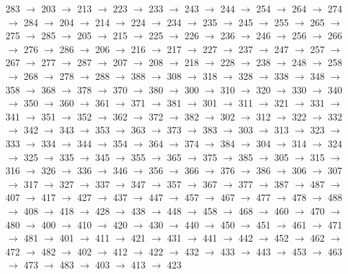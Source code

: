 283 $\rightarrow$ 203 $\rightarrow$ 213 $\rightarrow$ 223 $\rightarrow$ 233 $\rightarrow$ 243 $\rightarrow$ 244 $\rightarrow$ 254 $\rightarrow$ 264 $\rightarrow$ 274 $\rightarrow$ 284 $\rightarrow$ 204 $\rightarrow$ 214 $\rightarrow$ 224 $\rightarrow$ 234 $\rightarrow$ 235 $\rightarrow$ 245 $\rightarrow$ 255 $\rightarrow$ 265 $\rightarrow$ 275 $\rightarrow$ 285 $\rightarrow$ 205 $\rightarrow$ 215 $\rightarrow$ 225 $\rightarrow$ 226 $\rightarrow$ 236 $\rightarrow$ 246 $\rightarrow$ 256 $\rightarrow$ 266 $\rightarrow$ 276 $\rightarrow$ 286 $\rightarrow$ 206 $\rightarrow$ 216 $\rightarrow$ 217 $\rightarrow$ 227 $\rightarrow$ 237 $\rightarrow$ 247 $\rightarrow$ 257 $\rightarrow$ 267 $\rightarrow$ 277 $\rightarrow$ 287 $\rightarrow$ 207 $\rightarrow$ 208 $\rightarrow$ 218 $\rightarrow$ 228 $\rightarrow$ 238 $\rightarrow$ 248 $\rightarrow$ 258 $\rightarrow$ 268 $\rightarrow$ 278 $\rightarrow$ 288 $\rightarrow$ 388 $\rightarrow$ 308 $\rightarrow$ 318 $\rightarrow$ 328 $\rightarrow$ 338 $\rightarrow$ 348 $\rightarrow$ 358 $\rightarrow$ 368 $\rightarrow$ 378 $\rightarrow$ 370 $\rightarrow$ 380 $\rightarrow$ 300 $\rightarrow$ 310 $\rightarrow$ 320 $\rightarrow$ 330 $\rightarrow$ 340 $\rightarrow$ 350 $\rightarrow$ 360 $\rightarrow$ 361 $\rightarrow$ 371 $\rightarrow$ 381 $\rightarrow$ 301 $\rightarrow$ 311 $\rightarrow$ 321 $\rightarrow$ 331 $\rightarrow$ 341 $\rightarrow$ 351 $\rightarrow$ 352 $\rightarrow$ 362 $\rightarrow$ 372 $\rightarrow$ 382 $\rightarrow$ 302 $\rightarrow$ 312 $\rightarrow$ 322 $\rightarrow$ 332 $\rightarrow$ 342 $\rightarrow$ 343 $\rightarrow$ 353 $\rightarrow$ 363 $\rightarrow$ 373 $\rightarrow$ 383 $\rightarrow$ 303 $\rightarrow$ 313 $\rightarrow$ 323 $\rightarrow$ 333 $\rightarrow$ 334 $\rightarrow$ 344 $\rightarrow$ 354 $\rightarrow$ 364 $\rightarrow$ 374 $\rightarrow$ 384 $\rightarrow$ 304 $\rightarrow$ 314 $\rightarrow$ 324 $\rightarrow$ 325 $\rightarrow$ 335 $\rightarrow$ 345 $\rightarrow$ 355 $\rightarrow$ 365 $\rightarrow$ 375 $\rightarrow$ 385 $\rightarrow$ 305 $\rightarrow$ 315 $\rightarrow$ 316 $\rightarrow$ 326 $\rightarrow$ 336 $\rightarrow$ 346 $\rightarrow$ 356 $\rightarrow$ 366 $\rightarrow$ 376 $\rightarrow$ 386 $\rightarrow$ 306 $\rightarrow$ 307 $\rightarrow$ 317 $\rightarrow$ 327 $\rightarrow$ 337 $\rightarrow$ 347 $\rightarrow$ 357 $\rightarrow$ 367 $\rightarrow$ 377 $\rightarrow$ 387 $\rightarrow$ 487 $\rightarrow$ 407 $\rightarrow$ 417 $\rightarrow$ 427 $\rightarrow$ 437 $\rightarrow$ 447 $\rightarrow$ 457 $\rightarrow$ 467 $\rightarrow$ 477 $\rightarrow$ 478 $\rightarrow$ 488 $\rightarrow$ 408 $\rightarrow$ 418 $\rightarrow$ 428 $\rightarrow$ 438 $\rightarrow$ 448 $\rightarrow$ 458 $\rightarrow$ 468 $\rightarrow$ 460 $\rightarrow$ 470 $\rightarrow$ 480 $\rightarrow$ 400 $\rightarrow$ 410 $\rightarrow$ 420 $\rightarrow$ 430 $\rightarrow$ 440 $\rightarrow$ 450 $\rightarrow$ 451 $\rightarrow$ 461 $\rightarrow$ 471 $\rightarrow$ 481 $\rightarrow$ 401 $\rightarrow$ 411 $\rightarrow$ 421 $\rightarrow$ 431 $\rightarrow$ 441 $\rightarrow$ 442 $\rightarrow$ 452 $\rightarrow$ 462 $\rightarrow$ 472 $\rightarrow$ 482 $\rightarrow$ 402 $\rightarrow$ 412 $\rightarrow$ 422 $\rightarrow$ 432 $\rightarrow$ 433 $\rightarrow$ 443 $\rightarrow$ 453 $\rightarrow$ 463 $\rightarrow$ 473 $\rightarrow$ 483 $\rightarrow$ 403 $\rightarrow$ 413 $\rightarrow$ 423 